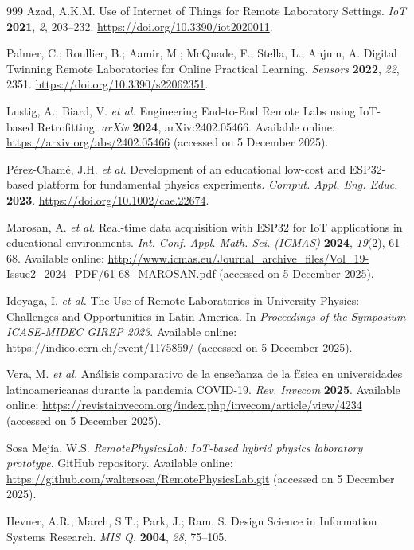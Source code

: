 \documentclass[sensors,article,submit,pdftex]{Definitions/mdpi}
\begin{document}
\begin{thebibliography}{999}
Azad, A.K.M.
Use of Internet of Things for Remote Laboratory Settings.
\textit{IoT} \textbf{2021}, \textit{2}, 203--232.
\href{https://doi.org/10.3390/iot2020011}{https://doi.org/10.3390/iot2020011}.

Palmer, C.; Roullier, B.; Aamir, M.; McQuade, F.; Stella, L.; Anjum, A.
Digital Twinning Remote Laboratories for Online Practical Learning.
\textit{Sensors} \textbf{2022}, \textit{22}, 2351.
\href{https://doi.org/10.3390/s22062351}{https://doi.org/10.3390/s22062351}.

Lustig, A.; Biard, V. \textit{et al.}
Engineering End-to-End Remote Labs using IoT-based Retrofitting.
\textit{arXiv} \textbf{2024}, arXiv:2402.05466.
Available online: \url{https://arxiv.org/abs/2402.05466} (accessed on 5 December 2025).

P\'erez-Cham\'e, J.H. \textit{et al.}
Development of an educational low-cost and ESP32-based platform for fundamental physics experiments.
\textit{Comput. Appl. Eng. Educ.} \textbf{2023}.
\href{https://doi.org/10.1002/cae.22674}{https://doi.org/10.1002/cae.22674}.

Marosan, A. \textit{et al.}
Real-time data acquisition with ESP32 for IoT applications in educational environments.
\textit{Int. Conf. Appl. Math. Sci. (ICMAS)} \textbf{2024}, \textit{19}(2), 61--68.
Available online: \url{http://www.icmas.eu/Journal_archive_files/Vol_19-Issue2_2024_PDF/61-68_MAROSAN.pdf} (accessed on 5 December 2025).

Idoyaga, I. \textit{et al.}
The Use of Remote Laboratories in University Physics: Challenges and Opportunities in Latin America.
In \textit{Proceedings of the Symposium ICASE-MIDEC GIREP 2023}.
Available online: \url{https://indico.cern.ch/event/1175859/} (accessed on 5 December 2025).

Vera, M. \textit{et al.}
An\'alisis comparativo de la ense\~nanza de la f\'isica en universidades latinoamericanas durante la pandemia COVID-19.
\textit{Rev. Invecom} \textbf{2025}.
Available online: \url{https://revistainvecom.org/index.php/invecom/article/view/4234} (accessed on 5 December 2025).

Sosa Mej\'ia, W.S.
\textit{RemotePhysicsLab: IoT-based hybrid physics laboratory prototype}.
GitHub repository.
Available online: \url{https://github.com/waltersosa/RemotePhysicsLab.git} (accessed on 5 December 2025).

Hevner, A.R.; March, S.T.; Park, J.; Ram, S.
Design Science in Information Systems Research.
\textit{MIS Q.} \textbf{2004}, \textit{28}, 75--105.


\end{thebibliography}
\end{document}
